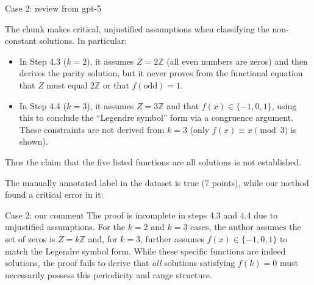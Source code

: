 \documentclass{article} %
\begin{document}
\begin{promptbox}{Case 2: review from gpt-5}
  

The chunk makes critical, unjustified assumptions when classifying the non-constant solutions. In particular:
\begin{itemize}
    \item In Step 4.3 ($k=2$), it assumes $Z=2\mathbb{Z}$ (all even numbers are zeros) and then derives the parity solution, but it never proves from the functional equation that $Z$ must equal $2\mathbb{Z}$ or that $f(\text{odd})=1$.
    \item In Step 4.4 ($k=3$), it assumes $Z=3\mathbb{Z}$ and that $f(x) \in \{-1,0,1\}$, using this to conclude the ``Legendre symbol'' form via a congruence argument. These constraints are not derived from $k=3$ (only $f(x) \equiv x \pmod{3}$ is shown).
\end{itemize}
Thus the claim that the five listed functions are all solutions is not established.
 
\end{promptbox}

The manually annotated label in the dataset is true (7 points), while our method found a critical error in it:

\begin{promptbox}{Case 2: our comment}
The proof is incomplete in steps 4.3 and 4.4 due to unjustified assumptions. For the $k=2$ and $k=3$ cases, the author assumes the set of zeros is $Z=k\mathbb{Z}$ and, for $k=3$, further assumes $f(x) \in \{-1, 0, 1\}$ to match the Legendre symbol form. While these specific functions are indeed solutions, the proof fails to derive that \textit{all} solutions satisfying $f(k)=0$ must necessarily possess this periodicity and range structure.
\end{promptbox}
\end{document}

